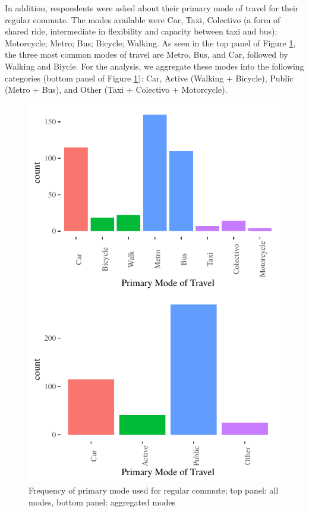 \documentclass[]{elsarticle} %
\makeatletter
\def\maxwidth{\ifdim\Gin@nat@width>\linewidth\linewidth
\else\Gin@nat@width\fi}
\let\Oldincludegraphics\includegraphics
\renewcommand{\includegraphics}[1]{\Oldincludegraphics[width=\maxwidth]{#1}}
\makeatother
\begin{document}
In addition, respondents were asked about their primary mode of travel
for their regular commute. The modes available were Car, Taxi, Colectivo
(a form of shared ride, intermediate in flexibility and capacity between
taxi and bus); Motorcycle; Metro; Bus; Bicycle; Walking. As seen in the
top panel of Figure \ref{fig:primary-mode-travel}, the three most common
modes of travel are Metro, Bus, and Car, followed by Walking and Biycle.
For the analysis, we aggregate these modes into the following categories
(bottom panel of Figure \ref{fig:primary-mode-travel}): Car, Active
(Walking + Bicycle), Public (Metro + Bus), and Other (Taxi + Colectivo +
Motorcycle).

\begin{figure}
\centering
\includegraphics{Dissonance_Santiago_v2_files/figure-latex/figure-primary-mode-travel-1.pdf}
\caption{\label{fig:primary-mode-travel}Frequency of primary mode used
for regular commute; top panel: all modes, bottom panel: aggregated
modes}
\end{figure}
\end{document}
